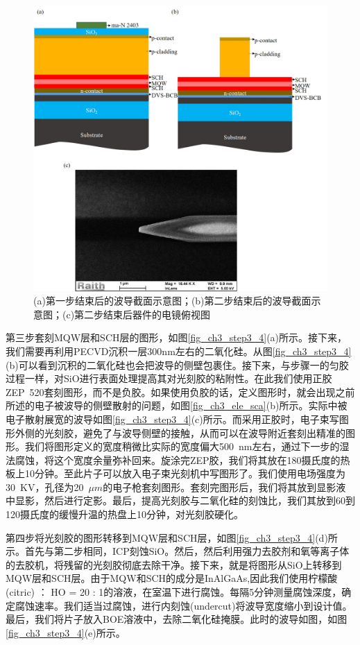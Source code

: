 \begin{figure}[htb]
	\centering
	\includegraphics[width=14cm]{./Pictures/fig_ch3_step1_2.jpg}
	\caption{(a)第一步结束后的波导截面示意图；(b)第二步结束后的波导截面示意图；(c)第二步结束后器件的电镜俯视图}
	\label{fig_ch3_step1_2}
\end{figure}

第三步套刻MQW层和SCH层的图形，如图\ref{fig_ch3_step3_4}(a)所示。接下来，我们需要再利用PECVD沉积一层300nm左右的二氧化硅。从图\ref{fig_ch3_step3_4}(b)可以看到沉积的二氧化硅也会把波导的侧壁包裹住。接下来，与步骤一的匀胶过程一样，对SiO进行表面处理提高其对光刻胶的粘附性。在此我们使用正胶ZEP~520套刻图形\cite{ZEP520}，而不是负胶。如果使用负胶的话，定义图形时，就会出现之前所述的电子被波导的侧壁散射的问题，如图\ref{fig_ch3_ele_sca}(b)所示。实际中被电子散射展宽的波导如图\ref{fig_ch3_step3_4}(c)所示。而采用正胶时，电子束写图形外侧的光刻胶，避免了与波导侧壁的接触，从而可以在波导附近套刻出精准的图形。我们将图形定义的宽度稍微比实际的宽度偏大500~nm左右，通过下一步的湿法腐蚀，将这个宽度余量弥补回来。旋涂完ZEP胶，我们将其放在180摄氏度的热板上10分钟。至此片子可以放入电子束光刻机中写图形了。我们使用电场强度为30~KV，孔径为20~$\mu m$的电子枪套刻图形。套刻完图形后，我们将其放到显影液中显影，然后进行定影。最后，提高光刻胶与二氧化硅的刻蚀比，我们其放到60到120摄氏度的缓慢升温的热盘上10分钟，对光刻胶硬化。

第四步将光刻胶的图形转移到MQW层和SCH层，如图\ref{fig_ch3_step3_4}(d)所示。首先与第二步相同，ICP刻蚀SiO。然后，然后利用强力去胶剂和氧等离子体的去胶机，将残留的光刻胶彻底去除干净。接下来，就是将图形从SiO上转移到MQW层和SCH层。由于MQW和SCH的成分是InAlGaAs,因此我们使用柠檬酸(citric) ： HO = 20 : 1的溶液，在室温下进行腐蚀。每隔5分钟测量腐蚀深度，确定腐蚀速率。我们适当过腐蚀，进行内刻蚀(undercut)将波导宽度缩小到设计值。最后，我们将片子放入BOE溶液中，去除二氧化硅掩膜。此时的波导如图，如图\ref{fig_ch3_step3_4}(e)所示。

